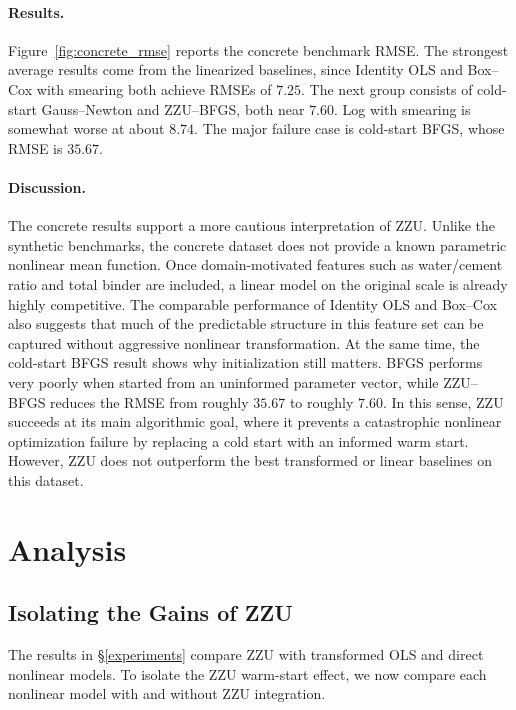 \documentclass[11pt]{article}
\begin{document}
\paragraph{Results.}
Figure~\ref{fig:concrete_rmse} reports the concrete benchmark RMSE. The strongest average results come from the linearized baselines, since Identity OLS and Box--Cox with smearing both achieve RMSEs of \(7.25\). The next group consists of cold-start Gauss--Newton and ZZU--BFGS, both near \(7.60\). Log with smearing is somewhat worse at about \(8.74\). The major failure case is cold-start BFGS, whose RMSE is \(35.67\).

\paragraph{Discussion.}
The concrete results support a more cautious interpretation of ZZU. Unlike the synthetic benchmarks, the concrete dataset does not provide a known parametric nonlinear mean function. Once domain-motivated features such as water/cement ratio and total binder are included, a linear model on the original scale is already highly competitive. The comparable performance of Identity OLS and Box--Cox also suggests that much of the predictable structure in this feature set can be captured without aggressive nonlinear transformation. At the same time, the cold-start BFGS result shows why initialization still matters. BFGS performs very poorly when started from an uninformed parameter vector, while ZZU--BFGS reduces the RMSE from roughly \(35.67\) to roughly \(7.60\). In this sense, ZZU succeeds at its main algorithmic goal, where it prevents a catastrophic nonlinear optimization failure by replacing a cold start with an informed warm start. However, ZZU does not outperform the best transformed or linear baselines on this dataset.

\section{Analysis}

\subsection{Isolating the Gains of ZZU}

The results in \S\ref{experiments} compare ZZU with transformed OLS and direct nonlinear models. To isolate the ZZU warm-start effect, we now compare each nonlinear model with and without ZZU integration.
\end{document}
